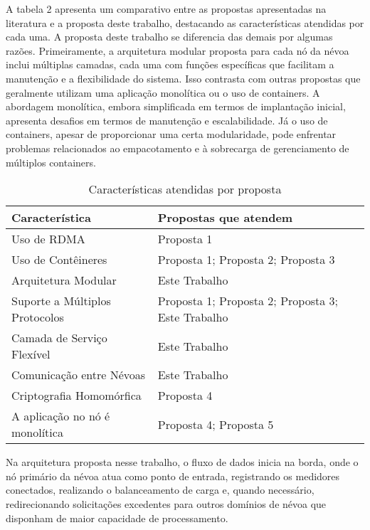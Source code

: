 A tabela 2 apresenta um comparativo entre as propostas apresentadas na literatura e a proposta deste trabalho, destacando as características atendidas por cada uma. A proposta deste trabalho se diferencia das demais por algumas razões. Primeiramente, a arquitetura modular proposta para cada nó da névoa inclui múltiplas camadas, cada uma com funções específicas que facilitam a manutenção e a flexibilidade do sistema. Isso contrasta com outras propostas que geralmente utilizam uma aplicação monolítica ou o uso de containers. A abordagem monolítica, embora simplificada em termos de implantação inicial, apresenta desafios em termos de manutenção e escalabilidade. Já o uso de containers, apesar de proporcionar uma certa modularidade, pode enfrentar problemas relacionados ao empacotamento e à sobrecarga de gerenciamento de múltiplos containers.

\begin{table}[htb]
	\ABNTEXfontereduzida
	\caption{\label{tab:Tab_ComparativoPorCaracteristica}Características atendidas por proposta}
	\begin{tabular}{@{}p{6.5cm}p{7.5cm}@{}}
		\toprule
		\textbf{Característica} & \textbf{Propostas que atendem} \\ \midrule
		Uso de RDMA                     & Proposta 1 \\ \midrule
		Uso de Contêineres             & Proposta 1; Proposta 2; Proposta 3 \\ \midrule
		Arquitetura Modular            & Este Trabalho \\ \midrule
		Suporte a Múltiplos Protocolos & Proposta 1; Proposta 2; Proposta 3; Este Trabalho \\ \midrule
		Camada de Serviço Flexível     & Este Trabalho \\ \midrule
		Comunicação entre Névoas       & Este Trabalho \\ \midrule
		Criptografia Homomórfica       & Proposta 4 \\ \midrule
		A aplicação no nó é monolítica & Proposta 4; Proposta 5 \\ \bottomrule
	\end{tabular}
\end{table}

Na arquitetura proposta nesse trabalho, o fluxo de dados inicia na borda, onde o nó primário da névoa atua como ponto de entrada, registrando os medidores conectados, realizando o balanceamento de carga e, quando necessário, redirecionando solicitações excedentes para outros domínios de névoa que disponham de maior capacidade de processamento.

